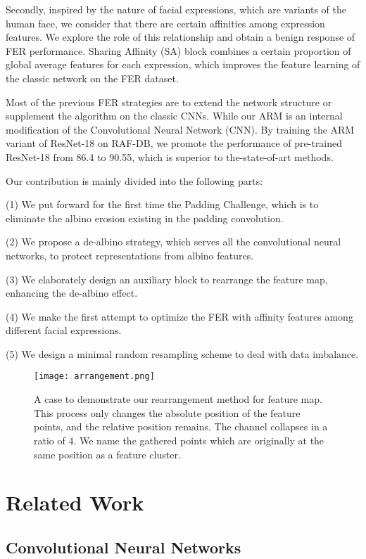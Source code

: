 \documentclass[10pt,twocolumn,letterpaper]{article}
\begin{document}
	Secondly, inspired by the nature of facial expressions, which are variants of the human face, we consider that there are certain affinities among expression features. We explore the role of this relationship and obtain a benign response of FER performance. Sharing Affinity (SA) block combines a certain proportion of global average features for each expression, which improves the feature learning of the classic network on the FER dataset.  

	Most of the previous FER strategies are to extend the network structure or supplement the algorithm on the classic CNNs. While our ARM is an internal modification of the Convolutional Neural Network (CNN). By training the ARM variant of ResNet-18 \cite{resnet} on RAF-DB, we promote the performance of pre-trained ResNet-18 from 86.4 to 90.55, which is superior to the-state-of-art methods.

Our contribution is mainly divided into the following parts:

(1) We put forward for the first time the Padding Challenge, which is to eliminate the albino erosion existing in the padding convolution.

(2) We propose a de-albino strategy, which serves all the convolutional neural networks, to protect representations from albino features.

(3) We elaborately design an auxiliary block to rearrange the feature map, enhancing the de-albino effect.

(4) We make the first attempt to optimize the FER with affinity features among different facial expressions.

(5) We design a minimal random resampling scheme to deal with data imbalance.

\begin{figure}
\begin{center}
\texttt{[image: arrangement.png]}
\end{center}
   \caption{A case to demonstrate our rearrangement method for feature map. This process only changes the absolute position of the feature points, and the relative position remains. The channel collapses in a ratio of 4. We name the gathered points which are originally at the same position as a feature cluster.}
\label{fig:arrangement}
\end{figure}
\section{Related Work}
\subsection{Convolutional Neural Networks}
\end{document}
